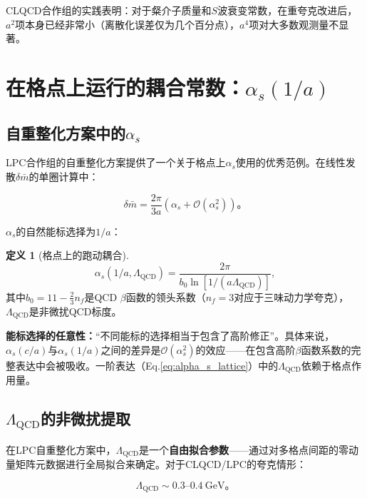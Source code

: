 \documentclass[12pt,a4paper]{ctexart}
\theoremstyle{definition}
\newtheorem{definition}{定义}[section]
\begin{document}
CLQCD合作组的实践表明\cite{CLQCD2024charm}：对于粲介子质量和$S$波衰变常数，在重夸克改进后，$a^2$项本身已经非常小（离散化误差仅为几个百分点），$a^4$项对大多数观测量不显著。

\section{在格点上运行的耦合常数：$\alpha_s(1/a)$}

\subsection{自重整化方案中的$\alpha_s$}

LPC合作组的自重整化方案\cite{Huo2021self}提供了一个关于格点上$\alpha_s$使用的优秀范例。在线性发散$\delta\bar{m}$的单圈计算中：

\begin{equation}
\delta\bar{m} = \frac{2\pi}{3a}(\alpha_s + \mathcal{O}(\alpha^2_s))。
\label{eq:delta_m_one_loop}
\end{equation}

$\alpha_s$的自然能标选择为$1/a$\cite{Huo2021self}：

\begin{definition}[格点上的跑动耦合]
\begin{equation}
\boxed{\alpha_s(1/a, \Lambda_{\text{QCD}}) = \frac{2\pi}{b_0 \ln[1/(a\Lambda_{\text{QCD}})]}},
\label{eq:alpha_s_lattice}
\end{equation}
其中$b_0 = 11 - \frac{2}{3}n_f$是QCD $\beta$函数的领头系数（$n_f = 3$对应于三味动力学夸克），$\Lambda_{\text{QCD}}$是非微扰QCD标度。
\end{definition}

\textbf{能标选择的任意性：}``不同能标的选择相当于包含了高阶修正''\cite{Huo2021self}。具体来说，$\alpha_s(c/a)$与$\alpha_s(1/a)$之间的差异是$\mathcal{O}(\alpha^2_s)$的效应——在包含高阶$\beta$函数系数的完整表达中会被吸收。一阶表达（Eq.\ref{eq:alpha_s_lattice}）中的$\Lambda_{\text{QCD}}$依赖于格点作用量。

\subsection{$\Lambda_{\text{QCD}}$的非微扰提取}

在LPC自重整化方案中\cite{Huo2021self}，$\Lambda_{\text{QCD}}$是一个\textbf{自由拟合参数}——通过对多格点间距的零动量矩阵元数据进行全局拟合来确定。对于CLQCD/LPC的夸克情形\cite{Huo2021self}：

\begin{equation}
\Lambda_{\text{QCD}} \sim 0.3\text{--}0.4\ \text{GeV}。
\label{eq:Lambda_fit}
\end{equation}
\end{document}
